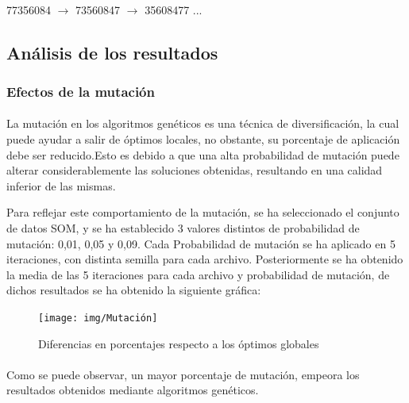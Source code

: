 	
	\paragraph{} 77356084 $\rightarrow$ 73560847 $\rightarrow$ 35608477  ...
	
	
	\subsection{Análisis de los resultados}
	
	\subsubsection{Efectos de la mutación}
	
	\paragraph{} La mutación en los algoritmos genéticos es una técnica de diversificación, la cual puede ayudar a salir de óptimos locales, no obstante, su porcentaje de aplicación debe ser reducido.Esto es debido a que una alta probabilidad de mutación puede alterar considerablemente las soluciones obtenidas, resultando en una calidad inferior de las mismas.
	
	 Para reflejar este comportamiento de la mutación, se ha seleccionado el conjunto de datos SOM, y se ha establecido 3 valores distintos de probabilidad de mutación: 0,01, 0,05 y 0,09. Cada Probabilidad de mutación se ha aplicado en 5 iteraciones, con distinta semilla para cada archivo. Posteriormente se ha obtenido la media de las 5 iteraciones para cada archivo y probabilidad de mutación, de dichos resultados se ha obtenido la siguiente gráfica:
	 
		 \begin{figure}[H]
		 	
		 	\centering
		 	\texttt{[image: img/Mutación]}
		 	\caption{Diferencias en porcentajes respecto a los óptimos globales}
		 	
		 \end{figure}
	 
	 \paragraph{}Como se puede observar, un mayor porcentaje de mutación, empeora los resultados obtenidos mediante algoritmos genéticos.
	

